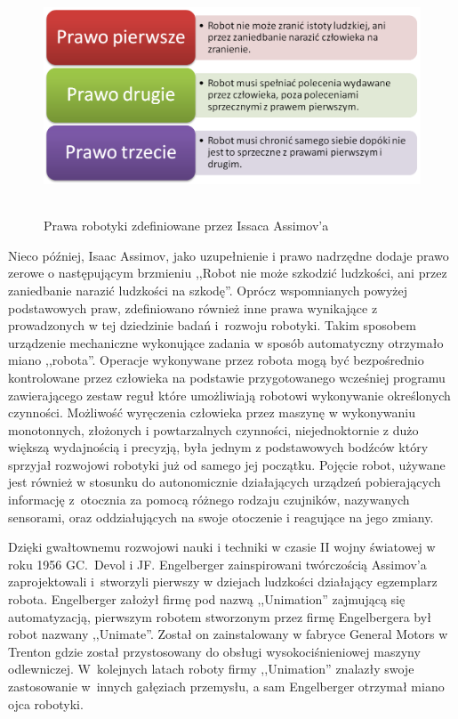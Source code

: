 \begin{figure}[h!] \centering
\includegraphics[height=70mm]{../images/ch01/assimov_laws.png}
	\caption{Prawa robotyki zdefiniowane przez Issaca Assimov'a}
	\label{fig:Assimov_Laws}
\end{figure}

Nieco później, Isaac Assimov, jako uzupełnienie i prawo nadrzędne dodaje prawo
zerowe o następującym brzmieniu ,,Robot nie może szkodzić ludzkości, ani przez
zaniedbanie narazić ludzkości na szkodę''\cite{website:robotyka-pl}. Oprócz
wspomnianych powyżej podstawowych praw, zdefiniowano również inne prawa
wynikające z prowadzonych w tej dziedzinie badań i~rozwoju robotyki. \newpage
Takim sposobem urządzenie mechaniczne wykonujące zadania w sposób automatyczny
otrzymało miano ,,robota''\cite{website:asimo-pl}. Operacje wykonywane przez
robota mogą być bezpośrednio kontrolowane przez człowieka na podstawie
przygotowanego wcześniej programu zawierającego zestaw reguł które umożliwiają
robotowi wykonywanie określonych czynności. Możliwość wyręczenia człowieka przez
maszynę w wykonywaniu monotonnych, złożonych i powtarzalnych czynności,
niejednoktornie z dużo większą wydajnością i precyzją, była jednym z podstawowych
bodźców który sprzyjał rozwojowi robotyki już od samego jej początku. Pojęcie
robot, używane jest również w stosunku do autonomicznie działających urządzeń
pobierających informację z~otocznia za pomocą różnego rodzaju czujników,
nazywanych sensorami, oraz oddziałujących na swoje otoczenie i reagujące na jego
zmiany.

Dzięki gwałtownemu rozwojowi nauki i techniki w czasie II wojny światowej w roku
1956 GC.~Devol i JF. Engelberger zainspirowani twórczością Assimov'a
zaprojektowali i~stworzyli pierwszy w dziejach ludzkości działający egzemplarz
robota\cite{website:robotyka-pl}. Engelberger założył firmę pod nazwą
,,Unimation'' zajmującą się automatyzacją, pierwszym robotem stworzonym przez
firmę Engelbergera był robot nazwany ,,Unimate''. Został on zainstalowany w
fabryce General Motors w Trenton gdzie został przystosowany do obsługi
wysokociśnieniowej maszyny odlewniczej. W~kolejnych latach roboty firmy
,,Unimation'' znalazły swoje zastosowanie w~innych gałęziach przemysłu, a sam
Engelberger otrzymał miano ojca robotyki.\cite{website:robotyka-pl}
 
